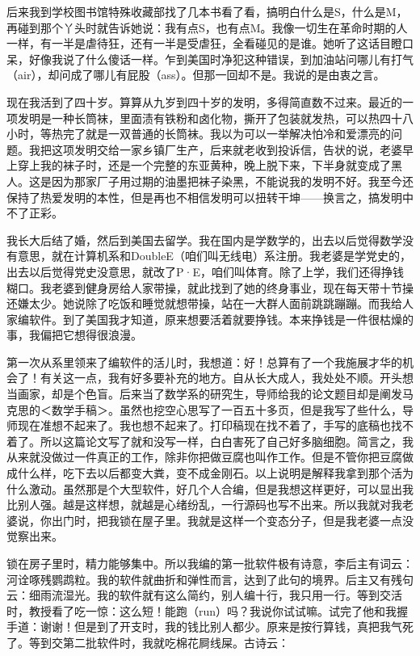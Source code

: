 后来我到学校图书馆特殊收藏部找了几本书看了看，搞明白什么是S，什么是M，再碰到那个丫头时就告诉她说：我有点S，也有点M。我像一切生在革命时期的人一样，有一半是虐待狂，还有一半是受虐狂，全看碰见的是谁。她听了这话目瞪口呆，好像我说了什么傻话一样。乍到美国时净犯这种错误，到加油站问哪儿有打气（air），却问成了哪儿有屁股（ass）。但那一回却不是。我说的是由衷之言。 

现在我活到了四十岁。算算从九岁到四十岁的发明，多得简直数不过来。最近的一项发明是一种长筒袜，里面渍有铁粉和卤化物，撕开了包装就发热，可以热四十八小时，等热完了就是一双普通的长筒袜。我以为可以一举解决怕冷和爱漂亮的问题。我把这项发明交给一家乡镇厂生产，后来就老收到投诉信，告状的说，老婆早上穿上我的袜子时，还是一个完整的东亚黄种，晚上脱下来，下半身就变成了黑人。这是因为那家厂子用过期的油墨把袜子染黑，不能说我的发明不好。我至今还保持了热爱发明的本性，但是再也不相信发明可以扭转干坤——换言之，搞发明中不了正彩。 

我长大后结了婚，然后到美国去留学。我在国内是学数学的，出去以后觉得数学没有意思，就在计算机系和DoubleE（咱们叫无线电）系注册。我老婆是学党史的，出去以后觉得党史没意思，就改了P·E，咱们叫体育。除了上学，我们还得挣钱糊口。我老婆到健身房给人家带操，就此找到了她的终身事业，现在每天带十节操还嫌太少。她说除了吃饭和睡觉就想带操，站在一大群人面前跳跳蹦蹦。而我给人家编软件。到了美国我才知道，原来想要活着就要挣钱。本来挣钱是一件很枯燥的事，我偏把它想得很浪漫。 

第一次从系里领来了编软件的活儿时，我想道：好！总算有了一个我施展才华的机会了！有关这一点，我有好多要补充的地方。自从长大成人，我处处不顺。开头想当画家，却是个色盲。后来当了数学系的研究生，导师给我的论文题目却是阐发马克思的＜数学手稿＞。虽然也挖空心思写了一百五十多页，但是我写了些什么，导师现在准想不起来了。我也想不起来了。打印稿现在找不着了，手写的底稿也找不着了。所以这篇论文写了就和没写一样，白白害死了自己好多脑细胞。简言之，我从来就没做过一件真正的工作，除非你把做豆腐也叫作工作。但是不管你把豆腐做成什么样，吃下去以后都变大粪，变不成金刚石。以上说明是解释我拿到那个活为什么激动。虽然那是个大型软件，好几个人合编，但是我想这样更好，可以显出我比别人强。越是这样想，就越是心绪纷乱，一行源码也写不出来。所以我就对我老婆说，你出门时，把我锁在屋子里。我就是这样一个变态分子，但是我老婆一点没觉察出来。 

锁在房子里时，精力能够集中。所以我编的第一批软件极有诗意，李后主有词云：河诠啄残鹦鹉粒。我的软件就曲折和弹性而言，达到了此句的境界。后主又有残句云：细雨流湿光。我的软件就有这么简约，别人编十行，我只用一行。等到交活时，教授看了吃一惊：这么短！能跑（run）吗？我说你试试嘛。试完了他和我握手道：谢谢！但是到了开支时，我的钱比别人都少。原来是按行算钱，真把我气死了。等到交第二批软件时，我就吃棉花屙线屎。古诗云： 

